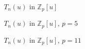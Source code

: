 \documentclass{beamer}
\begin{document}
\begin{frame}{$T_n(u)$ in $\mathbb{Z}_p[u]$}
\end{frame}

\begin{frame}{$T_n(u)$ in $\mathbb{Z}_p[u]$, $p=5$}
 \vspace{-18pt}
\end{frame}

\begin{frame}{$T_n(u)$ in $\mathbb{Z}_p[u]$, $p=11$}
 \vspace{-18pt}
\end{frame}
\end{document}
